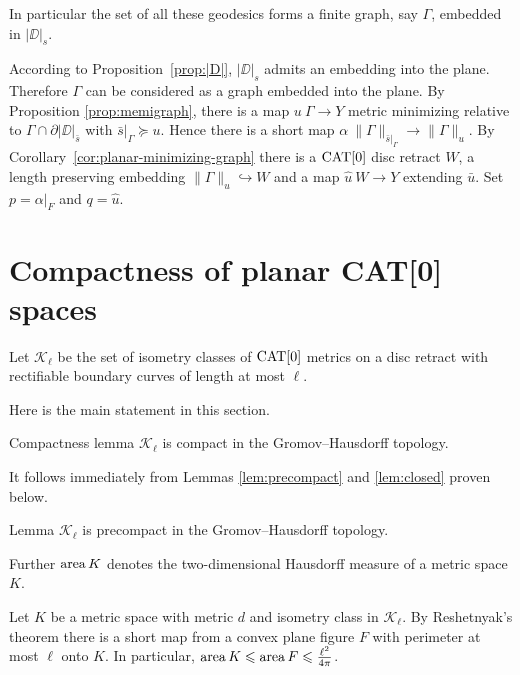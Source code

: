 \documentclass{article}
\begin{document}

In particular the set of all these geodesics forms a finite graph, say $\Gamma$,
embedded in $|\DD|_s$. 

According to Proposition~\ref{prop:|D|},
$|\DD|_s$ admits an embedding into the plane.
Therefore $\Gamma$ can be considered as a graph embedded into the plane.
By Proposition \ref{prop:memigraph}, there is a map $u\:\Gamma\to Y$ metric minimizing relative to $\Gamma\cap\partial|\DD|_{\bar s}$ with
$\bar s|_\Gamma\succcurlyeq u$. Hence there is a short map $\alpha\:\|\Gamma\|_{\bar s|_\Gamma}\to\|\Gamma\|_u$. 
By Corollary~\ref{cor:planar-minimizing-graph} there is a $\mathop{\rm CAT}\nolimits[0]$ disc retract $W$, a length preserving embedding
$\|\Gamma\|_u\hookrightarrow W$ and a map $\hat u\:W\to Y$ extending $\bar u$. %
Set $p=\alpha|_F$ and $q=\hat u$.
\qeds

\section{Compactness of planar CAT[0] spaces}

Let $\mathcal{K}_\ell$ be the set of isometry classes of $\mathop{\rm CAT}\nolimits[0]$ metrics on a disc retract with rectifiable
boundary curves of length at most $\ell$.


Here is the main statement in this section.

\begin{thm}{Compactness lemma}\label{lem:compact}
$\mathcal{K}_\ell$ is compact in the Gromov--Hausdorff topology.
\end{thm}

It follows immediately from Lemmas \ref{lem:precompact} and \ref{lem:closed} proven below.

\begin{thm}{Lemma}\label{lem:precompact}
$\mathcal{K}_\ell$ is precompact in the Gromov--Hausdorff topology.
\end{thm}

Further $\mathop{\rm area}\nolimits K$ denotes the two-dimensional Hausdorff measure of a metric space $K$. 

Let $K$ be a metric space with metric $d$ and isometry class in $\mathcal {K}_\ell$.
By Reshetnyak's theorem there is a short map from a convex plane figure $F$ with perimeter at most $\ell$ onto $K$.
In particular, $\mathop{\rm area}\nolimits K \leqslant \mathop{\rm area}\nolimits F \leqslant \tfrac{\ell^2}{4\pi}$.
\end{document}
